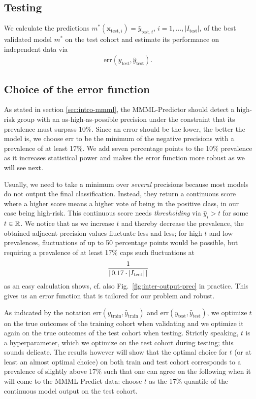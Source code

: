 \subsection{Testing}

We calculate the predictions $m^*(\mathbf{x}_{\text{test}, i}) = \hat{y}_{\text{test}, i}$, $i = 
1, \ldots, |I_\text{test}|$, of the 
best validated model $m^*$ on the test cohort and estimate its performance on independent data via 
\begin{align}
    \text{err}(y_\text{test}, \hat{y}_\text{test}).
\end{align}

\subsection{Choice of the error function}\label{sec:error-function}

As stated in section \ref{sec:intro-mmml}, the MMML-Predictor should detect a high-risk group 
with an as-high-as-possible precision under the constraint that its prevalence must surpass 
\num{10}\%. Since an error should be the lower, the better the model is, we choose 
$\text{err}$ to be the minimum of the negative precisions with a prevalence of at least 17\%. We 
add seven percentage points to the \num{10}\% prevalence as it increases statistical power and makes 
the error function more robust as we will see next. 

Usually, we need 
to take a minimum over \textit{several} precisions because most models do not output the final 
classification.
Instead, they return a continuous score where a higher score means a higher vote of being
in the positive class, in our case being high-risk. This continuous score needs 
\textit{thresholding} via $\hat{y}_i > t$ for some $t \in \RR$.
We notice that as we increase $t$ and thereby decrease the prevalence, the obtained 
adjacent precision values fluctuate less and less; for high $t$ and low 
prevalences, fluctuations of up to \num{50} percentage points would be possible, but requiring a 
prevalence of at least 17\% caps such fluctuations at 
\begin{align}
    \frac{1}{\ceil*{\num{0.17} \cdot |I_\text{test}|}}
\end{align}
as an easy calculation shows, cf. also Fig.\ 
\ref{fig:inter-output-prec} in practice. This gives us an error function that is tailored 
for our problem and robust.

As indicated by the notation $\text{err}(y_\text{train}, \hat{y}_\text{train})$ and 
$\text{err}(y_\text{test}, \hat{y}_\text{test})$, we optimize $t$ on the true outcomes 
of the training cohort when validating and we optimize it again on the true outcomes of the test cohort 
when testing. Strictly speaking, $t$ is a hyperparameter, which we optimize on the 
test cohort during testing; this sounds delicate. The results however will show that the optimal 
choice for $t$ (or at least an 
almost optimal choice) on both train and test cohort corresponds to a prevalence of 
slightly above 17\% such that one can agree on the following when it will come to the MMML-Predict 
data: choose $t$ as the 17\%-quantile of the continuous model output on the test cohort.

